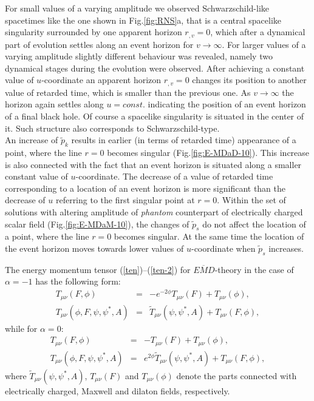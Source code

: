 \documentclass[aps,showpacs,nofootinbib,floatfix]{revtex4}
\newcommand{\ben}{\begin{eqnarray}}
\newcommand{\een}{\end{eqnarray}}
\newcommand{\tpe}{{\tilde p}}
\newcommand{\tT}{\tilde T}
\newcommand{\zpsi}{\psi^{\ast}}
\begin{document}
\par
For small values of a varying amplitude we observed Schwarzschild-like spacetimes like the one shown in Fig.\ref{fig:RNS}a, that is a central spacelike singularity surrounded by one apparent horizon $r_{,v}=0$, 
which after a dynamical part of evolution settles along an event horizon for $v\rightarrow\infty$. 
For larger values of a varying amplitude slightly different behaviour was revealed, namely two 
dynamical stages during the evolution were observed. After achieving a constant value of $u$-coordinate 
an apparent horizon $r_{,v}=0$ changes its position to another value of retarded time, which is smaller than 
the previous one. As $v\rightarrow\infty$ the horizon again settles along $u=const.$ indicating the position of an event horizon of a final black hole. Of course a spacelike singularity is situated in the center of it. Such structure also corresponds to Schwarzschild-type.\\
An increase of $\tpe_k$ results in earlier (in terms of retarded time) appearance of a point, where the line $r=0$ becomes singular (Fig.\ref{fig:E-MDaD-10}). This increase is also connected with the fact that an event horizon is situated along a smaller constant value of $u$-coordinate. The decrease of a value of retarded time corresponding to a location of an event horizon is more significant than the decrease of $u$ referring to the first singular point at $r=0$.
Within the set of solutions with altering amplitude of {\it phantom} counterpart of electrically charged scalar field (Fig.\ref{fig:E-MDaM-10}), the changes of $\tpe_s$ do not affect the location of a point, where the line $r=0$ becomes singular. At the same time the location of the event horizon moves towards lower values of $u$-coordinate when $\tpe_s$ increases.
\par
The energy momentum tensor (\ref{ten})--(\ref{ten-2}) for $E\overline{M}D$-theory in the case of $\alpha = -1$ has the following form:
\ben
T_{\mu \nu}(F, \phi) &=& - e^{- 2 \phi} T_{\mu \nu}(F) + T_{\mu \nu}(\phi), \\ \nonumber
T_{\mu \nu}(\phi, F, \psi, \zpsi, A) &=& \tT_{\mu \nu}(\psi, \zpsi, A) + T_{\mu \nu}(F, \phi),
\een
while for $\alpha = 0$:
\ben
T_{\mu \nu}(F, \phi) &=& - T_{\mu \nu}(F) + T_{\mu \nu}(\phi), \\ \nonumber
T_{\mu \nu}(\phi, F, \psi, \zpsi, A) &=& e^{2 \phi}\tT_{\mu \nu}(\psi, \zpsi, A) + T_{\mu \nu}(F, \phi),
\een
where $\tT_{\mu \nu}(\psi, \zpsi, A)$, $T_{\mu \nu}(F)$ and $T_{\mu \nu}(\phi)$ denote the parts connected with electrically charged, Maxwell and dilaton fields, respectively. 
\end{document}
